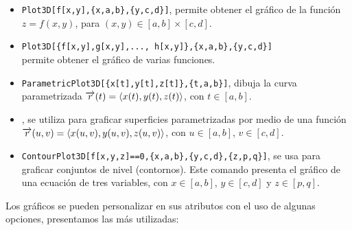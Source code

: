       \begin{itemize}
        \item \verb"Plot3D[f[x,y],{x,a,b},{y,c,d}]", permite obtener el gráfico de la función
          $z=f(x,y)$, para $(x,y) \in [a,b] \times [c,d]$.
        \item \texttt{Plot3D[\allowbreak\{f[x,y],\allowbreak g[x,y],\allowbreak ..., h[x,y]\},\allowbreak \{x,a,b\},\allowbreak \{y,c,d\}]} \\
          permite obtener el gráfico de varias funciones.
        \item \Verb!ParametricPlot3D[{x[t],y[t],z[t]},{t,a,b}]!,
          dibuja la curva parametrizada $\overrightarrow{r}(t)=\langle x(t),y(t),z(t) \rangle $,
          con $t\in[a,b]$.  
        \item {},
          se utiliza para graficar superficies parametrizadas por medio de una función
          $\overrightarrow{r}(u,v)=\langle x(u,v),y(u,v),z(u,v) \rangle $, con
          $u\in[a,b]$, $v\in[c,d]$.
        \item \verb"ContourPlot3D[f[x,y,z]==0,{x,a,b},{y,c,d},{z,p,q}]", se usa
          para graficar conjuntos de nivel (contornos).
          Este comando presenta el gráfico de una ecuación de tres variables, con $x\in[a,b]$,
          $y\in[c,d]$ y $z\in[p,q]$.  
      \end{itemize}

      Los gráficos se pueden personalizar en sus atributos con el uso de algunas opciones,
      presentamos las más utilizadas:

